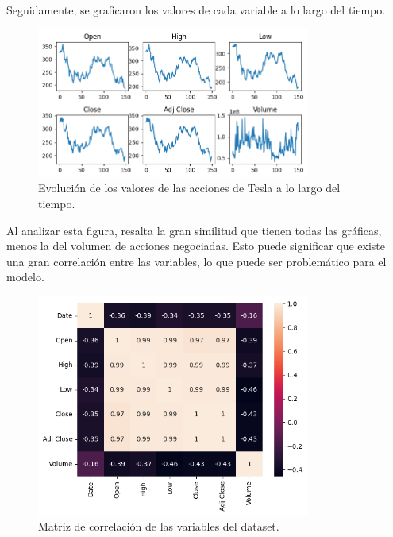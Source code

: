 \documentclass[a4paper, 12pt]{report}
\begin{document}
                        Seguidamente, se graficaron los valores de cada variable a lo largo del tiempo.

                        \begin{figure}[H]
                                \centering
                                \includegraphics[width=0.8\textwidth]{resources/images/stocks_time_series.png}
                                \caption{Evolución de los valores de las acciones de Tesla a lo largo del tiempo.}
                                \label{fig:stocks_time_series}
                        \end{figure}

                        Al analizar esta figura, resalta la gran similitud que tienen todas las gráficas, menos la del volumen de acciones negociadas.
                        Esto puede significar que existe una gran correlación entre las variables, lo que puede ser problemático para el modelo.\\

                        \begin{figure}[H]
                                \centering
                                \includegraphics[width=0.8\textwidth]{resources/images/stock_correlation_matrix.png}
                                \caption{Matriz de correlación de las variables del dataset.}
                                \label{fig:stocks_corr}
                        \end{figure}
\end{document}
